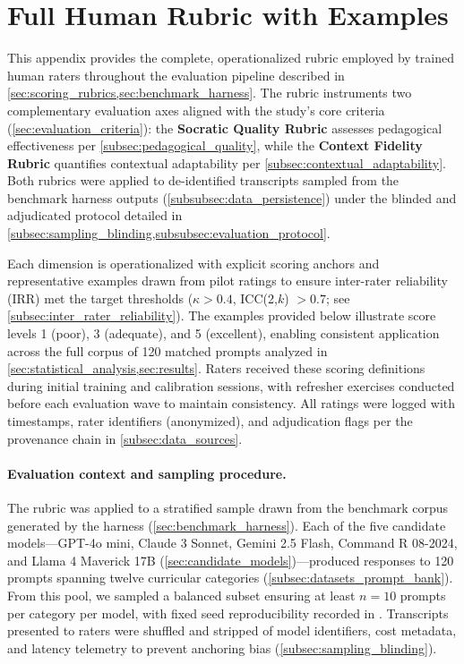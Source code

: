 \section{Full Human Rubric with Examples}
\label{app:rubric}

This appendix provides the complete, operationalized rubric employed by trained human raters throughout the evaluation pipeline described in \cref{sec:scoring_rubrics,sec:benchmark_harness}. The rubric instruments two complementary evaluation axes aligned with the study's core criteria (\cref{sec:evaluation_criteria}): the \textbf{Socratic Quality Rubric} assesses pedagogical effectiveness per \cref{subsec:pedagogical_quality}, while the \textbf{Context Fidelity Rubric} quantifies contextual adaptability per \cref{subsec:contextual_adaptability}. Both rubrics were applied to de-identified transcripts sampled from the benchmark harness outputs (\cref{subsubsec:data_persistence}) under the blinded and adjudicated protocol detailed in \cref{subsec:sampling_blinding,subsubsec:evaluation_protocol}.

Each dimension is operationalized with explicit scoring anchors and representative examples drawn from pilot ratings to ensure inter-rater reliability (IRR) met the target thresholds ($\kappa > 0.4$, ICC(2,$k$) $> 0.7$; see \cref{subsec:inter_rater_reliability}). The examples provided below illustrate score levels 1 (poor), 3 (adequate), and 5 (excellent), enabling consistent application across the full corpus of 120 matched prompts analyzed in \cref{sec:statistical_analysis,sec:results}. Raters received these scoring definitions during initial training and calibration sessions, with refresher exercises conducted before each evaluation wave to maintain consistency. All ratings were logged with timestamps, rater identifiers (anonymized), and adjudication flags per the provenance chain in \cref{subsec:data_sources}.

\paragraph{Evaluation context and sampling procedure.} The rubric was applied to a stratified sample drawn from the benchmark corpus generated by the harness (\cref{sec:benchmark_harness}). Each of the five candidate models—GPT-4o mini, Claude 3 Sonnet, Gemini 2.5 Flash, Command R 08-2024, and Llama 4 Maverick 17B (\cref{sec:candidate_models})—produced responses to 120 prompts spanning twelve curricular categories (\cref{subsec:datasets_prompt_bank}). From this pool, we sampled a balanced subset ensuring at least $n=10$ prompts per category per model, with fixed seed reproducibility recorded in . Transcripts presented to raters were shuffled and stripped of model identifiers, cost metadata, and latency telemetry to prevent anchoring bias (\cref{subsec:sampling_blinding}).


